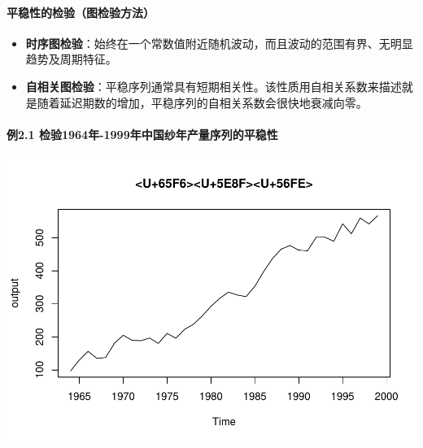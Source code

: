 \documentclass[]{article}
\newenvironment{Shaded}{\begin{snugshade}}{\end{snugshade}}
\newcommand{\DataTypeTok}[1]{\textcolor[rgb]{0.13,0.29,0.53}{#1}}
\newcommand{\DecValTok}[1]{\textcolor[rgb]{0.00,0.00,0.81}{#1}}
\newcommand{\KeywordTok}[1]{\textcolor[rgb]{0.13,0.29,0.53}{\textbf{#1}}}
\newcommand{\NormalTok}[1]{#1}
\newcommand{\OperatorTok}[1]{\textcolor[rgb]{0.81,0.36,0.00}{\textbf{#1}}}
\newcommand{\StringTok}[1]{\textcolor[rgb]{0.31,0.60,0.02}{#1}}
\let\oldparagraph\paragraph
\renewcommand{\paragraph}[1]{\oldparagraph{#1}\mbox{}}
\begin{document}
\hypertarget{ux5e73ux7a33ux6027ux7684ux68c0ux9a8cux56feux68c0ux9a8cux65b9ux6cd5}{%
\paragraph{平稳性的检验（图检验方法）}\label{ux5e73ux7a33ux6027ux7684ux68c0ux9a8cux56feux68c0ux9a8cux65b9ux6cd5}}

\begin{itemize}
\item
  \textbf{时序图检验}：始终在一个常数值附近随机波动，而且波动的范围有界、无明显趋势及周期特征。
\item
  \textbf{自相关图检验}：平稳序列通常具有短期相关性。该性质用自相关系数来描述就是随着延迟期数的增加，平稳序列的自相关系数会很快地衰减向零。
\end{itemize}

\hypertarget{ux4f8b2.1-ux68c0ux9a8c1964ux5e74-1999ux5e74ux4e2dux56fdux7eb1ux5e74ux4ea7ux91cfux5e8fux5217ux7684ux5e73ux7a33ux6027}{%
\paragraph{例2.1
检验1964年-1999年中国纱年产量序列的平稳性}\label{ux4f8b2.1-ux68c0ux9a8c1964ux5e74-1999ux5e74ux4e2dux56fdux7eb1ux5e74ux4ea7ux91cfux5e8fux5217ux7684ux5e73ux7a33ux6027}}

\begin{Shaded}
\end{Shaded}

\includegraphics{timeseries_files/figure-latex/ex2.1-1.pdf}
\end{document}
